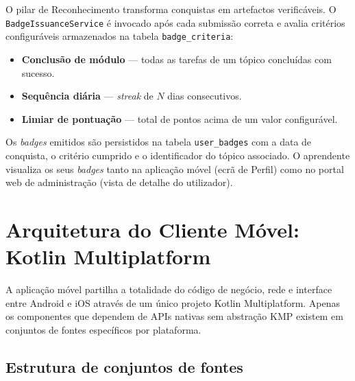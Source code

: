 O pilar de Reconhecimento transforma conquistas em artefactos verificáveis.
O \texttt{BadgeIssuanceService} é invocado após cada submissão correta e
avalia critérios configuráveis armazenados na tabela \texttt{badge\_criteria}:

\begin{itemize}
  \item \textbf{Conclusão de módulo} — todas as tarefas de um tópico
    concluídas com sucesso.
  \item \textbf{Sequência diária} — \textit{streak} de $N$ dias consecutivos.
  \item \textbf{Limiar de pontuação} — total de pontos acima de um valor
    configurável.
\end{itemize}

Os \textit{badges} emitidos são persistidos na tabela \texttt{user\_badges}
com a data de conquista, o critério cumprido e o identificador do tópico
associado.
O aprendente visualiza os seus \textit{badges} tanto na aplicação móvel
(ecrã de Perfil) como no portal web de administração (vista de detalhe
do utilizador).

\section{Arquitetura do Cliente Móvel: Kotlin Multiplatform}
\label{sec:kmp}

A aplicação móvel partilha a totalidade do código de negócio, rede e
interface entre Android e iOS através de um único projeto Kotlin
Multiplatform.
Apenas os componentes que dependem de APIs nativas sem abstração KMP
existem em conjuntos de fontes específicos por plataforma.

\subsection*{Estrutura de conjuntos de fontes}

